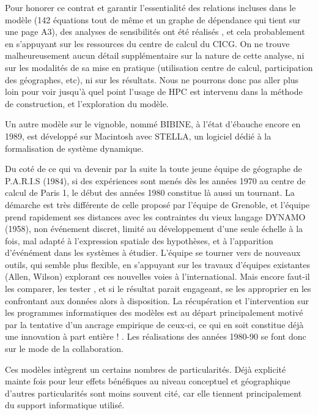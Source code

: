 Pour honorer ce contrat et garantir l'essentialité des relations incluses dans le modèle (142 équations tout de même et un graphe de dépendance qui tient sur une page A3), des analyses de sensibilités ont été réalisés \autocite[34]{AMORAL1983}, et cela probablement en s'appuyant sur les ressources du centre de calcul du CICG. On ne trouve malheureusement aucun détail supplémentaire sur la nature de cette analyse, ni sur les modalités de sa mise en pratique (utilisation centre de calcul, participation des géographes, etc), ni sur les résultats. Nous ne pourrons donc pas aller plus loin pour voir jusqu'à quel point l'usage de HPC est intervenu dans la méthode de construction, et l'exploration du modèle.

Un autre modèle sur le vignoble, nommé BIBINE, à l'état d'ébauche encore en 1989, est développé sur Macintosh avec STELLA, un logiciel dédié à la formalisation de système dynamique. \autocite{Chamussy1989}

Du coté de ce qui va devenir par la suite la toute jeune équipe de géographe de P.A.R.I.S (1984), si des expériences sont menés dès les années 1970 au centre de calcul de Paris 1, le début des années 1980 constitue là aussi un tournant. La démarche est très différente de celle proposé par l'équipe de Grenoble, et l'équipe prend rapidement ses distances avec les contraintes du vieux langage DYNAMO (1958), non événement discret, limité au développement d'une seule échelle à la fois, mal adapté à l'expression spatiale des hypothèses, et à l'apparition d'événément dans les systèmes à étudier. L'équipe se tourner vers de nouveaux outils, qui semble plus flexible, en s'appuyant sur les travaux d'équipes existantes (Allen, Wilson) explorant ces nouvelles voies à l'international. Mais encore faut-il les comparer, les tester \autocite{Pumain1983}, et si le résultat parait engageant, se les approprier en les confrontant aux données alors à disposition. La récupération et l'intervention sur les programmes informatiques des modèles est au départ principalement motivé par la tentative d’un ancrage empirique de ceux-ci, ce qui en soit constitue déjà une innovation à part entière ! \autocite{Pumain1982}. Les réalisations des années 1980-90 se font donc sur le mode de la collaboration.

Ces modèles intègrent un certains nombres de particularités. Déjà explicité mainte fois pour leur effets bénéfiques au niveau conceptuel et géographique \autocites{Pumain1989, Sanders1992} d'autres particularités sont moins souvent cité, car elle tiennent principalement du support informatique utilisé.

